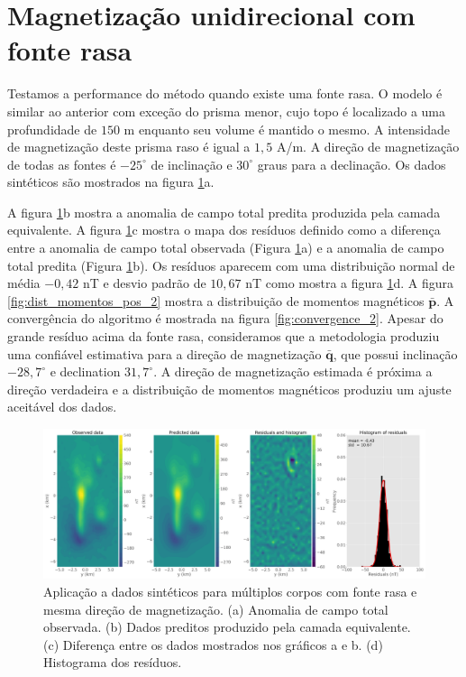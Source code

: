 \section{Magnetização unidirecional com fonte rasa}
\label{sec:unidir_shallow}

Testamos a performance do método quando existe uma fonte rasa. O modelo é similar ao anterior com exceção do prisma menor, cujo topo é localizado a uma profundidade de $150$ m enquanto seu volume é mantido o mesmo. A intensidade de magnetização deste prisma raso é igual a $1,5$ A/m. A direção de magnetização de todas as fontes é $-25^\circ$ de inclinação e $30^\circ$ graus para a declinação. Os dados sintéticos são mostrados na figura \ref{fig:data_fitting_2}a.

A figura \ref{fig:data_fitting_2}b mostra a anomalia de campo total predita produzida pela camada equivalente. A figura \ref{fig:data_fitting_2}c mostra o mapa dos resíduos definido como a diferença entre a anomalia de campo total observada (Figura \ref{fig:data_fitting_2}a) e a anomalia de campo total predita (Figura \ref{fig:data_fitting_2}b). Os resíduos aparecem com uma distribuição normal de média $-0,42$ nT e desvio padrão de $10,67$ nT como mostra a figura \ref{fig:data_fitting_2}d. A figura \ref{fig:dist_momentos_pos_2} mostra a distribuição de momentos magnéticos $\bar{\mathbf{p}}$. A convergência do algoritmo é mostrada na figura \ref{fig:convergence_2}. Apesar do grande resíduo acima da fonte rasa, consideramos que a metodologia produziu uma confiável estimativa para a direção de magnetização $\bar{\mathbf{q}}$, que possui inclinação $-28,7^\circ$ e declination $31,7^\circ$. A direção de magnetização estimada é próxima a direção verdadeira e a distribuição de momentos magnéticos produziu um ajuste aceitável dos dados. 

\begin{figure}
	\centering
	\includegraphics[width=1.1\textwidth]{Fig/eqlayer/unidir_shallow_test/data_fitting_LM_NNLS_magRM.png}
	\caption{Aplicação a dados sintéticos para múltiplos corpos com fonte rasa e mesma direção de magnetização. (a) Anomalia de campo total observada. (b) Dados preditos produzido pela camada equivalente. (c) Diferença entre os dados mostrados nos gráficos a e b. (d) Histograma dos resíduos.}
	\label{fig:data_fitting_2}
\end{figure}

